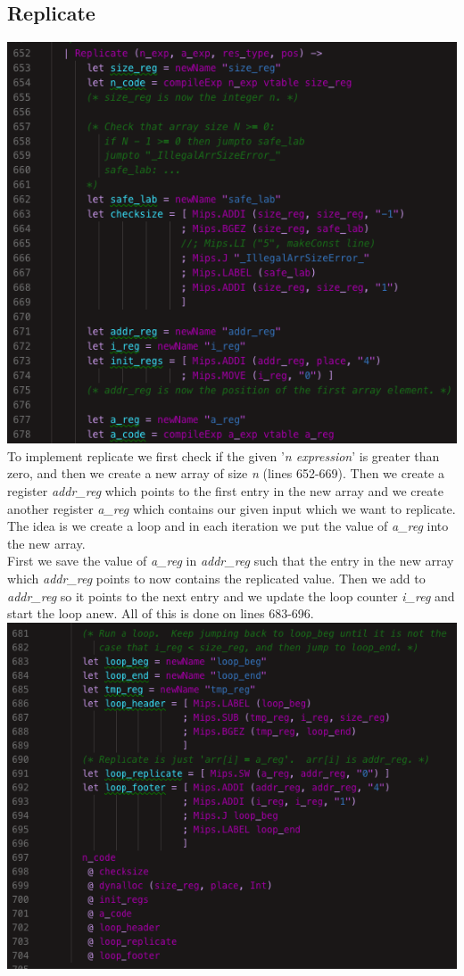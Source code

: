 \subsection{Replicate}
\includegraphics[width=\linewidth]{Materials/CodeGen/ReplicateIntro}
To implement replicate we first check if the given '\textit{n expression}' is greater than zero, and then we create a new array of size \textit{n} (lines 652-669). Then we create a register \textit{addr\_reg} which points to the first entry in the new array and we create another register \textit{a\_reg} which contains our given input which we want to replicate.\\
The idea is we create a loop and in each iteration we put the value of \textit{a\_reg} into the new array.\\
First we save the value of \textit{a\_reg} in \textit{addr\_reg} such that the entry in the new array which \textit{addr\_reg} points to now contains the replicated value. Then we add to \textit{addr\_reg} so it points to the next entry and we update the loop counter \textit{i\_reg} and start the loop anew. All of this is done on lines 683-696.\\
\includegraphics[width=\linewidth]{Materials/CodeGen/Replicate1}
